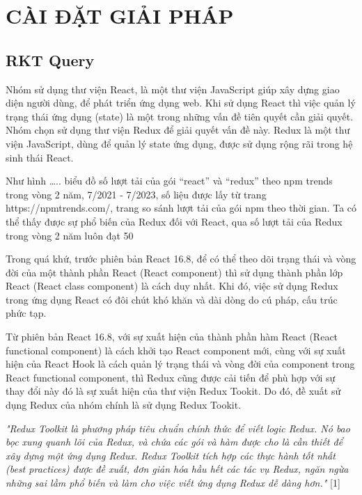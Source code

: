 \chapter{CÀI ĐẶT GIẢI PHÁP}

\section{RKT Query}

\tab Nhóm sử dụng thư viện React, là một thư viện JavaScript giúp xây dựng giao diện người dùng, để phát triển ứng dụng web.
Khi sử dụng React thì việc quản lý trạng thái ứng dụng (state) là một trong những vấn đề tiên quyết cần giải quyết.
Nhóm chọn sử dụng thư viện Redux để giải quyết vấn đề này.
Redux là một thư viện JavaScript, dùng để quản lý state ứng dụng, được sử dụng rộng rãi trong hệ sinh thái React.
\par

Như hình ….. biểu đồ số lượt tải của gói “react” và “redux” theo npm trends trong vòng 2 năm, 7/2021 - 7/2023, số liệu được lấy từ trang https://npmtrends.com/, trang so sánh lượt tải của gói npm theo thời gian.
Ta có thể thấy được sự phổ biến của Redux đối với React, qua số lượt tải của Redux trong vòng 2 năm luôn đạt 50%
\par

Trong quá khứ, trước phiên bản React 16.8, để có thể theo dõi trạng thái và vòng đời của một thành phần React (React component) thì sử dụng thành phần lớp React (React class component) là cách duy nhất.
Khi đó, việc sử dụng Redux trong ứng dụng React có đôi chút khó khăn và dài dòng do cú pháp, cấu trúc phức tạp.
\par

Từ phiên bản React 16.8, với sự xuất hiện của thành phần hàm React (React functional component) là cách khởi tạo React component mới, cùng với sự xuất hiện của React Hook là cách quản lý trạng thái và vòng đời của component trong React functional component, thì Redux cũng được cải tiến để phù hợp với sự thay đổi này đó là sự xuất hiện của thư viện Redux Tookit.
Do đó, đề xuất sử dụng Redux của nhóm chính là sử dụng Redux Tookit.
\par

\textit{"Redux Toolkit là phương pháp tiêu chuẩn chính thức để viết logic Redux.
Nó bao bọc xung quanh lõi của Redux, và chứa các gói và hàm được cho là cần thiết để xây dựng một ứng dụng Redux.
Redux Toolkit tích hợp các thực hành tốt nhất (best practices) được đề xuất, đơn giản hóa hầu hết các tác vụ Redux, ngăn ngừa những sai lầm phổ biến và làm cho việc viết ứng dụng Redux dễ dàng hơn."} [1]
\par

